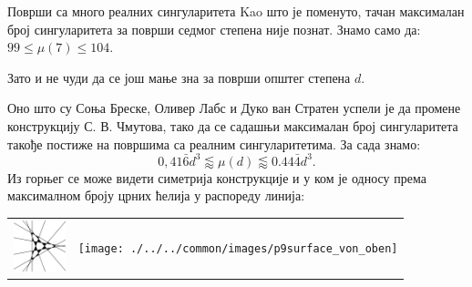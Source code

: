 \begin{surferPage}[216 сингуларитета]{Површи са много реалних сингуларитета}
    Kao што је поменуто, тачан максималан број сингуларитета за површи 
	седмог степена није познат.
    Знамо само да: $99\le \mu(7) \le 104$. 


    Зато и не чуди да се још мање зна за површи општег степена  $d$. 

    Оно што су Соња Бреске, Оливер Лабс и Дуко ван Стратен успели је да промене 
	конструкцију С. В. Чмутова, тако да се садашњи максималан број сингуларитета такође 
	постиже на површима са реалним сингуларитетима. 
    За сада знамо:
    \[0,41\bar{6}d^3 \lessapprox \mu(d) \lessapprox 0.44\bar{4} d^3.\]
     Из горњег се може видети симетрија конструкције и у ком је односу према максималном 
	 броју црних ћелија у распореду линија:
    \begin{center}
      \begin{tabular}{c@{\qquad}c}
        \includegraphics[height=1.5cm]{./../../common/images/vielesing.pdf}
        &
        \texttt{[image: ./../../common/images/p9surface\_von\_oben]}
      \end{tabular}
    \end{center}
\end{surferPage}

